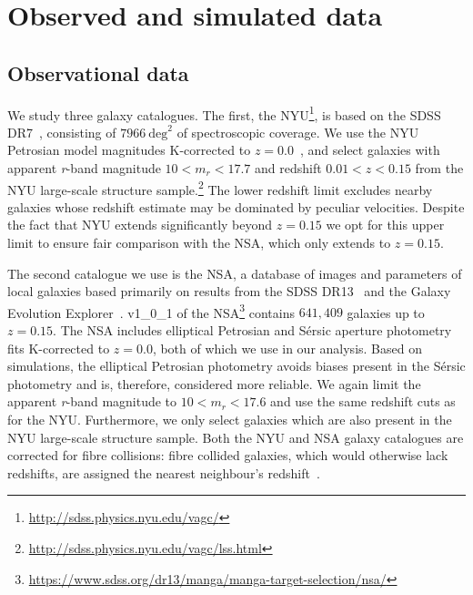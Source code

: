 \documentclass[usenatbib,useAMS]{mnras}
\begin{document}
\section{Observed and simulated data}
\label{sec:data}

\subsection{Observational data}\label{sec:data_obs}

We study three galaxy catalogues. The first, the \ac{NYU}\footnote{\url{http://sdss.physics.nyu.edu/vagc/}}, is based on the \ac{SDSS} DR7~\citep{SDSS, SDSS_DR7, SDSStargeting}, consisting of $7966~\text{deg}^2$ of spectroscopic coverage. We use the \ac{NYU} Petrosian model magnitudes K-corrected to $z=0.0$~\citep{Kcorrect}, and select galaxies with apparent \textit{r}-band magnitude $10 < m_r < 17.7$ and redshift $0.01 < z < 0.15$ from the \ac{NYU} large-scale structure sample.\footnote{\url{http://sdss.physics.nyu.edu/vagc/lss.html}} The lower redshift limit excludes nearby galaxies whose redshift estimate may be dominated by peculiar velocities. Despite the fact that \ac{NYU} extends significantly beyond $z=0.15$ we opt for this upper limit to ensure fair comparison with the \ac{NSA}, which only extends to $z=0.15$.


The second catalogue we use is the \ac{NSA}, a database of images and parameters of local galaxies based primarily on results from the \ac{SDSS} DR13~\citep{SDSS_DR13} and the Galaxy Evolution Explorer~\citep{GALEX}. v1\_0\_1 of the NSA\footnote{\url{https://www.sdss.org/dr13/manga/manga-target-selection/nsa/}} contains $641,409$ galaxies up to $z=0.15$. The \ac{NSA} includes elliptical Petrosian and S\'ersic aperture photometry fits K-corrected to $z=0.0$, both of which we use in our analysis. Based on simulations, the elliptical Petrosian photometry avoids biases present in the S\'ersic photometry and is, therefore, considered more reliable. We again limit the apparent \textit{r}-band magnitude to $10 < m_r < 17.6$ and use the same redshift cuts as for the \ac{NYU}. Furthermore, we only select galaxies which are also present in the \ac{NYU} large-scale structure sample.
Both the \ac{NYU} and \ac{NSA} galaxy catalogues are corrected for fibre collisions: fibre collided galaxies, which would otherwise lack redshifts, are assigned the nearest neighbour's redshift~\citep{SDSS_early, Zehavi_Fiber}.
\end{document}
